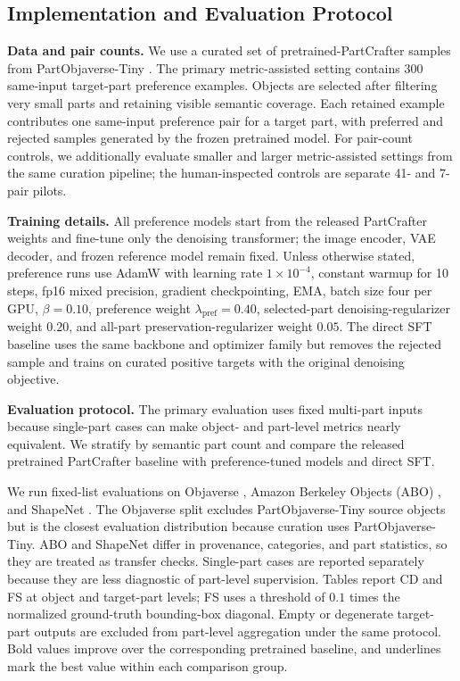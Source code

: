 \documentclass[10pt,twocolumn,letterpaper]{article}
\begin{document}
\subsection{Implementation and Evaluation Protocol}
\label{sec:experiment_protocol}
\noindent\textbf{Data and pair counts.}
We use a curated set of pretrained-PartCrafter samples from PartObjaverse-Tiny \cite{yang2024sampart3d}. The primary metric-assisted setting contains 300 same-input target-part preference examples. Objects are selected after filtering very small parts and retaining visible semantic coverage. Each retained example contributes one same-input preference pair for a target part, with preferred and rejected samples generated by the frozen pretrained model. For pair-count controls, we additionally evaluate smaller and larger metric-assisted settings from the same curation pipeline; the human-inspected controls are separate 41- and 7-pair pilots.

\noindent\textbf{Training details.}
All preference models start from the released PartCrafter weights and fine-tune only the denoising transformer; the image encoder, VAE decoder, and frozen reference model remain fixed. Unless otherwise stated, preference runs use AdamW with learning rate $1\times 10^{-4}$, constant warmup for 10 steps, fp16 mixed precision, gradient checkpointing, EMA, batch size four per GPU, $\beta=0.10$, preference weight $\lambda_{\mathrm{pref}}=0.40$, selected-part denoising-regularizer weight $0.20$, and all-part preservation-regularizer weight $0.05$. The direct SFT baseline uses the same backbone and optimizer family but removes the rejected sample and trains on curated positive targets with the original denoising objective.

\noindent\textbf{Evaluation protocol.}
The primary evaluation uses fixed multi-part inputs because single-part cases can make object- and part-level metrics nearly equivalent. We stratify by semantic part count and compare the released pretrained PartCrafter baseline with preference-tuned models and direct SFT.

We run fixed-list evaluations on Objaverse \cite{deitke2023objaverse}, Amazon Berkeley Objects (ABO) \cite{collins2022abo}, and ShapeNet \cite{chang2015shapenet}. The Objaverse split excludes PartObjaverse-Tiny source objects but is the closest evaluation distribution because curation uses PartObjaverse-Tiny. ABO and ShapeNet differ in provenance, categories, and part statistics, so they are treated as transfer checks.
Single-part cases are reported separately because they are less diagnostic of part-level supervision. Tables report CD and FS at object and target-part levels; FS uses a threshold of $0.1$ times the normalized ground-truth bounding-box diagonal. Empty or degenerate target-part outputs are excluded from part-level aggregation under the same protocol. Bold values improve over the corresponding pretrained baseline, and underlines mark the best value within each comparison group.
\end{document}
